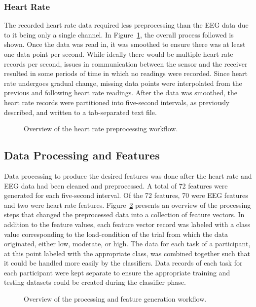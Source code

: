\documentclass[11pt]{article}
\begin{document}
		\subsubsection{Heart Rate}
		The recorded heart rate data required less preprocessing than the EEG data due to it being only a single channel. In Figure~\ref{fig:heart-preprocessing}, the overall process followed is shown. Once the data was read in, it was smoothed to ensure there was at least one data point per second. While ideally there would be multiple heart rate records per second, issues in communication between the sensor and the receiver resulted in some periods of time in which no readings were recorded.  Since heart rate undergoes gradual change, missing data points were interpolated from the previous and following heart rate readings.  After the data was smoothed, the heart rate records were partitioned into five-second intervals, as previously described, and written to a tab-separated text file.  

		\begin{figure}
		\centering
		\caption{Overview of the heart rate preprocessing workflow.}
		\label{fig:heart-preprocessing}
		\end{figure} 
			
	\subsection{Data Processing and Features}
	Data processing to produce the desired features was done after the heart rate and EEG data had been cleaned and preprocessed. A total of 72 features were generated for each five-second interval. Of the 72 features, 70 were EEG features and two were heart rate features. Figure~\ref{fig:feature_generation} presents an overview of the processing steps that changed the preprocessed data into a collection of feature vectors. In addition to the feature values, each feature vector record was labeled with a class value corresponding to the load-condition of the trial from which the data originated, either low, moderate, or high. The data for each task of a participant, at this point labeled with the appropriate class, was combined together such that it could be handled more easily by the classifiers. Data records of each task for each participant were kept separate to ensure the appropriate training and testing datasets could be created during the classifier phase.

	\begin{figure}
	\centering
	\caption{Overview of the processing and feature generation workflow.}
	\label{fig:feature_generation}
	\end{figure} 
	
\end{document}

